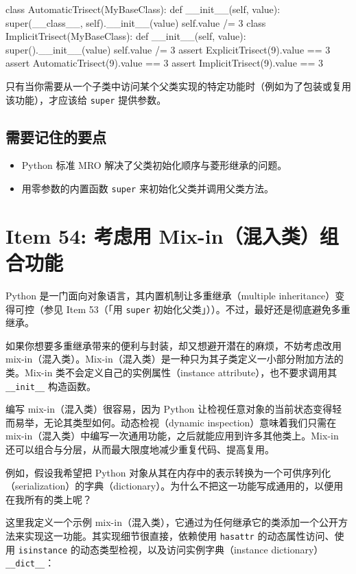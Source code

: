 \begin{codebox}[python]
class AutomaticTrisect(MyBaseClass):
    def __init__(self, value):
        super(__class__, self).__init__(value)
        self.value /= 3
class ImplicitTrisect(MyBaseClass):
    def __init__(self, value):
        super().__init__(value)
        self.value /= 3
assert ExplicitTrisect(9).value == 3
assert AutomaticTrisect(9).value == 3
assert ImplicitTrisect(9).value == 3
\end{codebox}

只有当你需要从一个子类中访问某个父类实现的特定功能时（例如为了包装或复用该功能），才应该给 \texttt{super} 提供参数。

\subsection{需要记住的要点}

\begin{itemize}
\item Python 标准 MRO 解决了父类初始化顺序与菱形继承的问题。
\item 用零参数的内置函数 \texttt{super} 来初始化父类并调用父类方法。
\end{itemize}

\section{Item 54: 考虑用 Mix-in（混入类）组合功能}

Python 是一门面向对象语言，其内置机制让多重继承（multiple inheritance）变得可控（参见 Item 53（「用 \texttt{super} 初始化父类」））。不过，最好还是彻底避免多重继承。

如果你想要多重继承带来的便利与封装，却又想避开潜在的麻烦，不妨考虑改用 mix-in（混入类）。Mix-in（混入类）是一种只为其子类定义一小部分附加方法的类。Mix-in 类不会定义自己的实例属性（instance attribute），也不要求调用其 \texttt{\_\_init\_\_} 构造函数。

编写 mix-in（混入类）很容易，因为 Python 让检视任意对象的当前状态变得轻而易举，无论其类型如何。动态检视（dynamic inspection）意味着我们只需在 mix-in（混入类）中编写一次通用功能，之后就能应用到许多其他类上。Mix-in 还可以组合与分层，从而最大限度地减少重复代码、提高复用。

例如，假设我希望把 Python 对象从其在内存中的表示转换为一个可供序列化（serialization）的字典（dictionary）。为什么不把这一功能写成通用的，以便用在我所有的类上呢？

这里我定义一个示例 mix-in（混入类），它通过为任何继承它的类添加一个公开方法来实现这一功能。其实现细节很直接，依赖使用 \texttt{hasattr} 的动态属性访问、使用 \texttt{isinstance} 的动态类型检视，以及访问实例字典（instance dictionary）\texttt{\_\_dict\_\_}：

